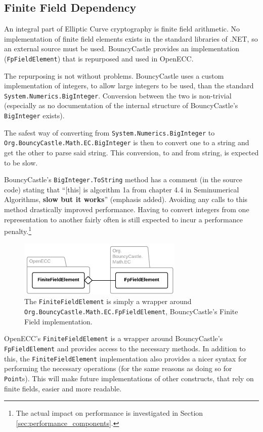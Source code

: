 \subsection{Finite Field Dependency}
\label{sec:implementation__dependencies}
\label{sec:implementation_dependency}

An integral part of Elliptic Curve cryptography is finite field arithmetic. No implementation of finite field elements exists
in the standard libraries of .NET, so an external source must be used. BouncyCastle provides an implementation (\texttt{FpFieldElement})
that is repurposed and used in OpenECC.

The repurposing is not without problems. BouncyCastle uses a custom implementation of integers, to allow large integers to
be used, than the standard \texttt{System.Numerics.BigInteger}. Conversion between the two is non-trivial (especially as no documentation
of the internal structure of BouncyCastle's \texttt{BigInteger} exists).

The safest way of converting from \texttt{System.Numerics.BigInteger} to \\
\texttt{Org.BouncyCastle.Math.EC.BigInteger} is then to convert one to a string and get the other to parse said string. This conversion,
to and from string, is expected to be slow.

BouncyCastle's \verb+BigInteger.ToString+ method has a comment (in the source code) stating that ``[this] is algorithm 1a from chapter
4.4 in Seminumerical Algorithms, \textbf{slow but it works}'' (emphasis added). Avoiding any calls to this method drastically improved
performance. Having to convert integers from one representation to another fairly often is still expected to incur a performance
penalty.\footnote{The actual impact on performance is investigated in Section \ref{sec:performance_components}.}

\begin{figure}[htb]
	\centering
	\includegraphics[width=0.7\textwidth]{implementation/finitefields}
	\caption{The \texttt{FiniteFieldElement} is simply a wrapper around \texttt{Org.BouncyCastle.Math.EC.FpFieldElement},
		BouncyCastle's Finite Field implementation.}
\end{figure}

OpenECC's \texttt{FiniteFieldElement} is a wrapper around BouncyCastle's \\
\verb+FpFieldElement+ and provides access to the necessary methods.
In addition to this, the \texttt{FiniteFieldElement} implementation also provides a nicer syntax for performing the necessary operations
(for the same reasons as doing so for \texttt{Point}s). This will make future implementations of other constructs, that rely on finite fields,
easier and more readable.